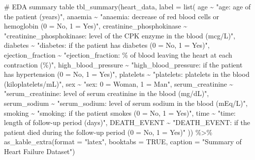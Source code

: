 \documentclass[
  letterpaper,
  DIV=11,
  numbers=noendperiod]{scrartcl}
\newenvironment{Shaded}{\begin{snugshade}}{\end{snugshade}}
\newcommand{\AttributeTok}[1]{\textcolor[rgb]{0.40,0.45,0.13}{#1}}
\newcommand{\CommentTok}[1]{\textcolor[rgb]{0.37,0.37,0.37}{#1}}
\newcommand{\ConstantTok}[1]{\textcolor[rgb]{0.56,0.35,0.01}{#1}}
\newcommand{\FunctionTok}[1]{\textcolor[rgb]{0.28,0.35,0.67}{#1}}
\newcommand{\NormalTok}[1]{\textcolor[rgb]{0.00,0.23,0.31}{#1}}
\newcommand{\SpecialCharTok}[1]{\textcolor[rgb]{0.37,0.37,0.37}{#1}}
\newcommand{\StringTok}[1]{\textcolor[rgb]{0.13,0.47,0.30}{#1}}
\begin{document}
\begin{Shaded}
\begin{Highlighting}[]
\CommentTok{\# EDA summary table}
\FunctionTok{tbl\_summary}\NormalTok{(heart\_data,}
            \AttributeTok{label =} \FunctionTok{list}\NormalTok{(}
\NormalTok{              age }\SpecialCharTok{\textasciitilde{}} \StringTok{"age: age of the patient (years)"}\NormalTok{,}
\NormalTok{              anaemia }\SpecialCharTok{\textasciitilde{}} \StringTok{"anaemia: decrease of red blood cells or hemoglobin (0 = No, 1 = Yes)"}\NormalTok{,}
\NormalTok{              creatinine\_phosphokinase }\SpecialCharTok{\textasciitilde{}} \StringTok{"creatinine\_phosphokinase: level of the CPK enzyme in the blood (mcg/L)"}\NormalTok{,}
\NormalTok{              diabetes }\SpecialCharTok{\textasciitilde{}} \StringTok{"diabetes: if the patient has diabetes (0 = No, 1 = Yes)"}\NormalTok{,}
\NormalTok{              ejection\_fraction }\SpecialCharTok{\textasciitilde{}} \StringTok{"ejection\_fraction: \% of blood leaving the heart at each contraction (\%)"}\NormalTok{,}
\NormalTok{              high\_blood\_pressure }\SpecialCharTok{\textasciitilde{}} \StringTok{"high\_blood\_pressure: if the patient has hypertension (0 = No, 1 = Yes)"}\NormalTok{,}
\NormalTok{              platelets }\SpecialCharTok{\textasciitilde{}} \StringTok{"platelets: platelets in the blood (kiloplatelets/mL)"}\NormalTok{,}
\NormalTok{              sex }\SpecialCharTok{\textasciitilde{}} \StringTok{"sex: 0 = Woman, 1 = Man"}\NormalTok{,}
\NormalTok{              serum\_creatinine }\SpecialCharTok{\textasciitilde{}} \StringTok{"serum\_creatinine: level of serum creatinine in the blood (mg/dL)"}\NormalTok{,}
\NormalTok{              serum\_sodium }\SpecialCharTok{\textasciitilde{}} \StringTok{"serum\_sodium: level of serum sodium in the blood (mEq/L)"}\NormalTok{,}
\NormalTok{              smoking }\SpecialCharTok{\textasciitilde{}} \StringTok{"smoking: if the patient smokes (0 = No, 1 = Yes)"}\NormalTok{,}
\NormalTok{              time }\SpecialCharTok{\textasciitilde{}} \StringTok{"time: length of follow{-}up period (days)"}\NormalTok{,}
\NormalTok{              DEATH\_EVENT }\SpecialCharTok{\textasciitilde{}} \StringTok{"DEATH\_EVENT: if the patient died during the follow{-}up period (0 = No, 1 = Yes)"}
\NormalTok{            ))  }\SpecialCharTok{\%\textgreater{}\%}
  \FunctionTok{as\_kable\_extra}\NormalTok{(}\AttributeTok{format =} \StringTok{"latex"}\NormalTok{, }\AttributeTok{booktabs =} \ConstantTok{TRUE}\NormalTok{, }\AttributeTok{caption =} \StringTok{"Summary of Heart Failure Dataset"}\NormalTok{)}
\end{Highlighting}
\end{Shaded}
\end{document}
